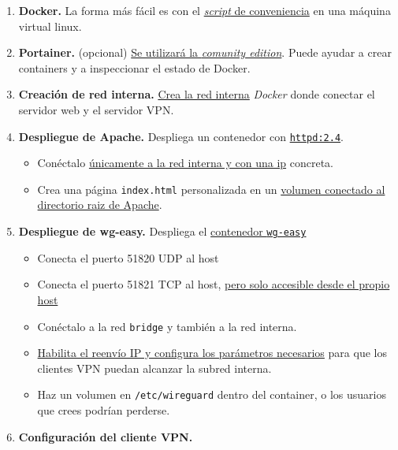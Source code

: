 \documentclass[a4paper]{article}
\begin{document}
\begin{enumerate}
\item \textbf{Docker.} La forma más fácil es con el \href{https://docs.docker.com/engine/install/ubuntu/\#install-using-the-convenience-script}{\emph{script} de conveniencia} en una máquina virtual linux.
\item \textbf{Portainer.} (opcional) \href{https://docs.portainer.io/start/install-ce/server/docker/linux}{Se utilizará la \emph{comunity edition}}. Puede ayudar a crear containers y a inspeccionar el estado de Docker.
\item \textbf{Creación de red interna.} \href{https://docs.docker.com/reference/cli/docker/network/create/}{Crea la red interna} \emph{Docker} donde conectar el servidor web y el servidor VPN.
\item \textbf{Despliegue de Apache.} Despliega un contenedor con \href{https://hub.docker.com/\_/httpd}{\texttt{httpd:2.4}}.
\begin{itemize}
\item Conéctalo \href{https://stackoverflow.com/a/35359185}{únicamente a la red interna y con una ip} concreta.
\item Crea una página \texttt{index.html} personalizada en un \href{https://hub.docker.com/\_/httpd\#without-a-dockerfile}{volumen conectado al directorio raiz de Apache}.
\end{itemize}
\item \textbf{Despliegue de wg-easy.} Despliega el \href{https://hub.docker.com/r/weejewel/wg-easy}{contenedor \texttt{wg-easy}}
\begin{itemize}
\item Conecta el puerto 51820 UDP al host
\item Conecta el puerto 51821 TCP al host, \href{https://stackoverflow.com/a/22100687}{pero solo accesible desde el propio host}
\item Conéctalo a la red \texttt{bridge} y también a la red interna.
\item \href{https://hub.docker.com/r/weejewel/wg-easy\#2-run-wireguard-easy}{Habilita el reenvío IP y configura los parámetros necesarios} para que los clientes VPN puedan alcanzar la subred interna.
\item Haz un volumen en \texttt{/etc/wireguard} dentro del container, o los usuarios que crees podrían perderse.
\end{itemize}
\item \textbf{Configuración del cliente VPN.}
\begin{itemize}

\end{itemize}
\end{enumerate}
\end{document}
